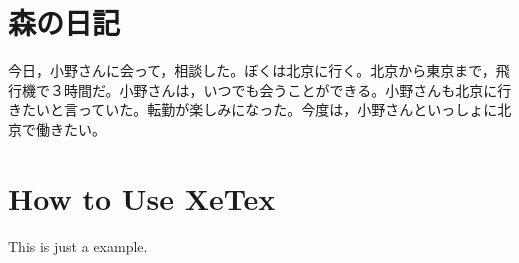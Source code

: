 \documentclass[12pt,a4paper]{article}
\begin{document}
\section{森の日記}
今日，小野さんに会って，相談した。ぼくは北京に行く。北京から東京まで，飛行機で３時間だ。小野さんは，いつでも会うことができる。小野さんも北京に行きたいと言っていた。転勤が楽しみになった。今度は，小野さんといっしょに北京で働きたい。
\section{How to Use XeTex}
This is just a example.
\end{document}
